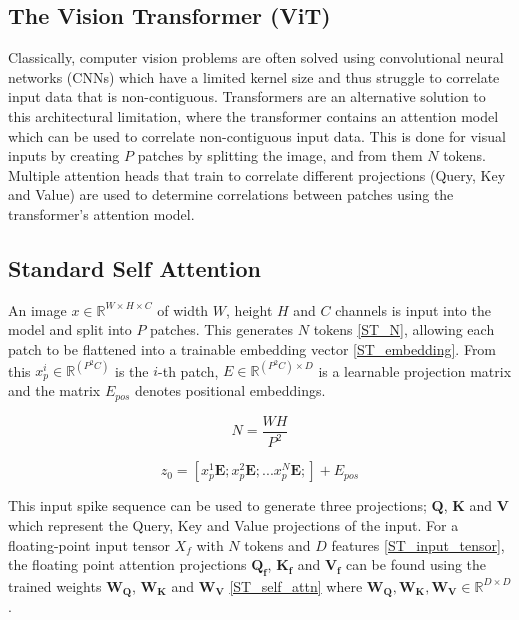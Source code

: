 \documentclass[../main.tex]{subfiles}
\begin{document}
\subsection{The Vision Transformer (ViT)}
Classically, computer vision problems are often solved using convolutional neural networks (CNNs) which have a limited kernel size and thus struggle to correlate input data that is non-contiguous. Transformers are an alternative solution to this architectural limitation, where the transformer contains an attention model which can be used to correlate non-contiguous input data. This is done for visual inputs by creating $P$ patches by splitting the image, and from them $N$ tokens. Multiple attention heads that train to correlate different projections (Query, Key and Value) are used to determine correlations between patches using the transformer's attention model.

\subsection{Standard Self Attention}
An image $x\in\mathbb{R}^{W\times H\times C}$ of width $W$, height $H$ and $C$ channels is input into the model and split into $P$ patches. This generates $N$ tokens \eqref{ST_N}, allowing each patch to be flattened into a trainable embedding vector \eqref{ST_embedding}\cite{imageClass}. From this $x_p^i\in\mathbb{R}^{(P^2C)}$ is the $i$-th patch, $E\in\mathbb{R}^{(P^2C)\times D}$ is a learnable projection matrix and the matrix $E_{pos}$ denotes positional embeddings\cite{imageClass}.

\begin{equation}\label{ST_N}
N=\frac{WH}{P^2}
\end{equation}

\begin{equation}\label{ST_embedding}
z_0=[x_p^1\mathbf{E};x_p^2\mathbf{E};...x_p^N\mathbf{E};]+E_{pos}
\end{equation}

\par This input spike sequence can be used to generate three projections; $\mathbf{Q}$, $\mathbf{K}$ and $\mathbf{V}$ which represent the Query, Key and Value\cite{imageClass} projections of the input. For a floating-point input tensor $X_f$ with $N$ tokens and $D$ features \eqref{ST_input_tensor}, the floating point attention projections $\mathbf{Q_f}$, $\mathbf{K_f}$ and $\mathbf{V_f}$ can be found using the trained weights $\mathbf{W_Q}$, $\mathbf{W_K}$ and $\mathbf{W_V}$ \eqref{ST_self_attn} where $\mathbf{W_Q}, \mathbf{W_K}, \mathbf{W_V}\in\mathbb{R}^{D\times D}$.
\end{document}
